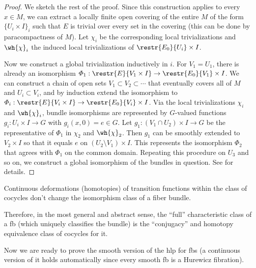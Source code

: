 \begin{proof}
    We sketch the rest of the proof. Since this construction applies to every $x\in M$, we can extract a locally finite open covering of the entire $M$ of the form $\{U_i\times I\}_i$ such that $E$ is trivial over every set in the covering (this can be done by paracompactness of $M$). Let $\chi_i$ be the corresponding local trivializations and $\wh{\chi}_i$ the induced local trivializations of $\restr{E_0}{U_i}\times I$.

    Now we construct a global trivialization inductively in $i$. For $V_1=U_1$, there is already an isomorphism $\varPhi_1:\restr{E}{V_1\times I}\to\restr{E_0}{V_1}\times I$. We can construct a chain of open sets $V_1\subset V_2\subset\cdots$ that eventually covers all of $M$ and $U_i\subset V_i$, and by induction extend the isomorphism to $\varPhi_i:\restr{E}{V_i\times I}\to\restr{E_0}{V_i}\times I$. Via the local trivializations $\chi_i$ and $\wh{\chi}_i$, bundle isomorphisms are represented by $G$-valued functions $g_i:U_{i}\times I\to G$ with $g_i(x,0)=e\in G$. Let $g_1:(V_1\cap U_2)\times I\to G$ be the representative of $\varPhi_1$ in $\chi_2$ and $\wh{\chi}_2$. Then $g_1$ can be smoothly extended to $V_2\times I$ so that it equals $e$ on $(U_2\setminus V_1)\times I$. This represents the isomorphism $\varPhi_2$ that agrees with $\varPhi_1$ on the common domain. Repeating this procedure on $U_3$ and so on, we construct a global isomorphism of the bundles in question. See \cite[Thm.~3.3.1]{RS2} for details.
\end{proof}

\begin{cor}
    Continuous deformations (homotopies) of transition functions within the class of cocycles don't change the isomorphism class of a fiber bundle.
\end{cor}



Therefore, in the most general and abstract sense, the ``full'' characteristic class of a \gls{fb} (which uniquely classifies the bundle) is the ``conjugacy'' and homotopy equivalence class of cocycles for it.

Now we are ready to prove the smooth version of the \gls{hlp} for \glspl{fb} (a continuous version of it holds automatically since every smooth \gls{fb} is a Hurewicz fibration).

